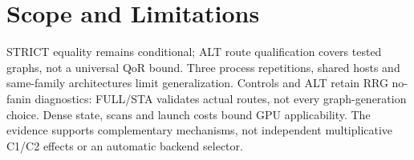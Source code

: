 \section{Scope and Limitations}
STRICT equality remains conditional; ALT route qualification covers tested graphs, not a universal QoR bound. Three process repetitions, shared hosts and same-family architectures limit generalization. Controls and ALT retain RRG no-fanin diagnostics: FULL/STA validates actual routes, not every graph-generation choice. Dense state, scans and launch costs bound GPU applicability. The evidence supports complementary mechanisms, not independent multiplicative C1/C2 effects or an automatic backend selector.
